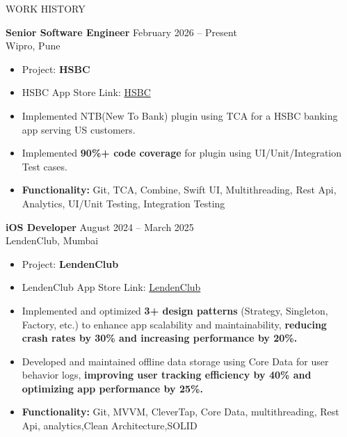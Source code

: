 \documentclass{resume} %
\begin{document}
\begin{rSection}{WORK HISTORY}

\textbf{Senior Software Engineer} \hfill February 2026 -- Present\\
Wipro, Pune
\begin{itemize}
    \itemsep -3pt
    \item Project: \textbf{HSBC}
    \item HSBC App Store Link: \href{https://apps.apple.com/us/app/hsbc-us/id1344750175}{HSBC}
    \item Implemented NTB(New To Bank) plugin using TCA for a HSBC banking app serving US customers.
    \item Implemented \textbf{90\%+ code coverage} for  plugin using UI/Unit/Integration Test cases.
    \item \textbf{Functionality:} Git, TCA, Combine, Swift UI, Multithreading, Rest Api, Analytics, UI/Unit Testing, Integration Testing
\end{itemize}

\textbf{iOS Developer} \hfill August 2024 -- March 2025\\
LendenClub, Mumbai
\begin{itemize}
    \itemsep -3pt
    \item Project: \textbf{LendenClub}
    \item LendenClub App Store Link: \href{https://apps.apple.com/in/app/lendenclub-p2p-lending/id1389013846}{LendenClub}
    \item Implemented and optimized \textbf{3+ design patterns} (Strategy, Singleton, Factory, etc.) to enhance app scalability and maintainability, \textbf{reducing crash rates by 30\% and increasing performance by 20\%.}
    \item Developed and maintained offline data storage using Core Data for user behavior logs, \textbf{improving user tracking efficiency by 40\% and optimizing app performance by 25\%.}
    \item \textbf{Functionality:} Git, MVVM, CleverTap, Core Data, multithreading, Rest Api, analytics,Clean Architecture,SOLID
\end{itemize}


\end{rSection}
\end{document}
